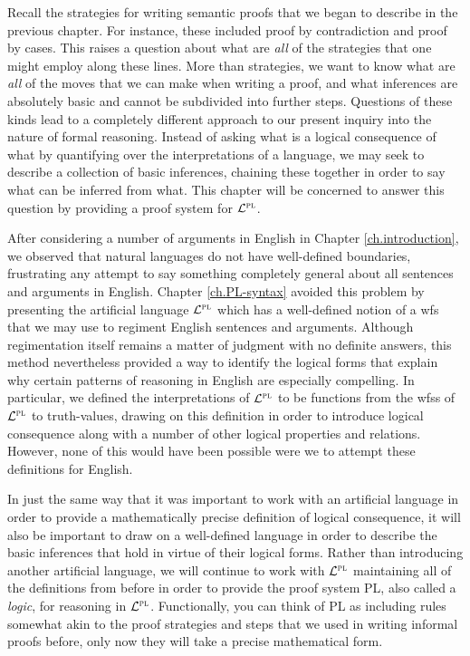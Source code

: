 Recall the strategies for writing semantic proofs that we began to describe in the previous chapter.
For instance, these included proof by contradiction and proof by cases.
This raises a question about what are \textit{all} of the strategies that one might employ along these lines.
More than strategies, we want to know what are \textit{all} of the moves that we can make when writing a proof, and what inferences are absolutely basic and cannot be subdivided into further steps.
Questions of these kinds lead to a completely different approach to our present inquiry into the nature of formal reasoning.
Instead of asking what is a logical consequence of what by quantifying over the interpretations of a language, we may seek to describe a collection of basic inferences, chaining these together in order to say what can be inferred from what.
This chapter will be concerned to answer this question by providing a proof system for $\mathcal{L}^{\textsc{pl}}$.

After considering a number of arguments in English in Chapter \ref{ch.introduction}, we observed that natural languages do not have well-defined boundaries, frustrating any attempt to say something completely general about all sentences and arguments in English.
Chapter \ref{ch.PL-syntax} avoided this problem by presenting the artificial language $\mathcal{L}^{\textsc{pl}}$ which has a well-defined notion of a wfs that we may use to regiment English sentences and arguments.
Although regimentation itself remains a matter of judgment with no definite answers, this method nevertheless provided a way to identify the logical forms that explain why certain patterns of reasoning in English are especially compelling.
In particular, we defined the interpretations of $\mathcal{L}^{\textsc{pl}}$ to be functions from the wfss of $\mathcal{L}^{\textsc{pl}}$ to truth-values, drawing on this definition in order to introduce logical consequence along with a number of other logical properties and relations.
However, none of this would have been possible were we to attempt these definitions for English.
 
In just the same way that it was important to work with an artificial language in order to provide a mathematically precise definition of logical consequence, it will also be important to draw on a well-defined language in order to describe the basic inferences that hold in virtue of their logical forms.
Rather than introducing another artificial language, we will continue to work with $\mathcal{L}^{\textsc{pl}}$ maintaining all of the definitions from before in order to provide the proof system PL, also called a \textit{logic}, for reasoning in $\mathcal{L}^{\textsc{pl}}$. 
Functionally, you can think of PL as including rules somewhat akin to the proof strategies and steps that we used in writing informal proofs before, only now they will take a precise mathematical form.

